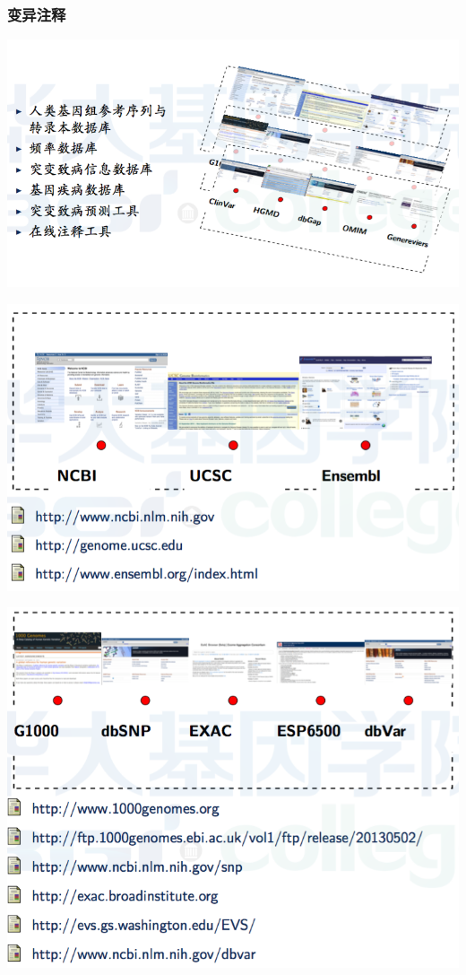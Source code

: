 \documentclass[12pt]{beamer}
\begin{document}
\begin{frame}\frametitle{变异注释}
  \includegraphics[width=\textwidth]{figures/old_slides/anno1.png}  
\end{frame}

\begin{frame}
  \includegraphics[width=\textwidth]{figures/old_slides/anno2.png}  
\end{frame}

\begin{frame}
  \includegraphics[width=\textwidth]{figures/old_slides/anno3.png}  
\end{frame}
\end{document}
